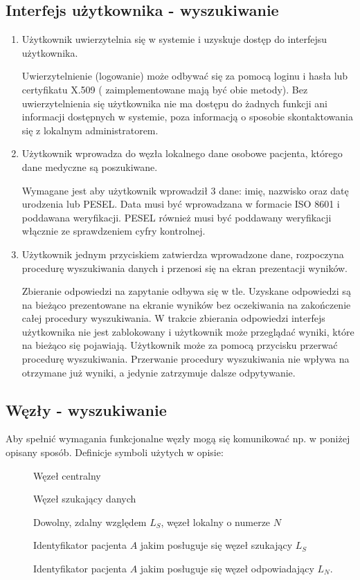 \documentclass[a4paper]{report}
\begin{document}
\subsection{Interfejs użytkownika - wyszukiwanie}
\begin{enumerate}
  \item Użytkownik uwierzytelnia się w systemie i uzyskuje dostęp do interfejsu użytkownika.

    Uwierzytelnienie (logowanie) może odbywać się za pomocą loginu i hasła lub certyfikatu X.509 (
    zaimplementowane mają być obie metody). Bez uwierzytelnienia się użytkownika nie ma dostępu do
    żadnych funkcji ani informacji dostępnych w systemie, poza informacją o sposobie skontaktowania
    się z lokalnym administratorem.

  \item Użytkownik wprowadza do węzła lokalnego dane osobowe pacjenta, którego dane medyczne są poszukiwane.

        Wymagane jest aby użytkownik wprowadził 3 dane: imię, nazwisko oraz datę urodzenia lub PESEL.
        Data musi być wprowadzana w formacie ISO 8601 i poddawana weryfikacji. PESEL również musi być
        poddawany weryfikacji włącznie ze sprawdzeniem cyfry kontrolnej.
  
  \item Użytkownik jednym przyciskiem zatwierdza wprowadzone dane, rozpoczyna procedurę wyszukiwania danych i przenosi
  się na ekran prezentacji wyników.

        Zbieranie odpowiedzi na zapytanie odbywa się w tle. Uzyskane odpowiedzi są na bieżąco prezentowane na
        ekranie wyników bez oczekiwania na zakończenie całej procedury wyszukiwania. W trakcie zbierania odpowiedzi
        interfejs użytkownika nie jest zablokowany i użytkownik może przeglądać wyniki, które na bieżąco się pojawiają.
        Użytkownik może za pomocą przycisku przerwać procedurę wyszukiwania. Przerwanie procedury wyszukiwania
        nie wpływa na otrzymane już wyniki, a jedynie zatrzymuje dalsze odpytywanie.
  
\end{enumerate}

\subsection{Węzły - wyszukiwanie}

Aby spełnić wymagania funkcjonalne węzły mogą się komunikować np. w poniżej opisany sposób.
Definicje symboli użytych w opisie:
\begin{description}
  \item[] Węzeł centralny
  \item[] Węzeł szukający danych
  \item[] Dowolny, zdalny względem $L_S$, węzeł lokalny o numerze $N$
  \item[] Identyfikator pacjenta $A$ jakim posługuje się węzeł szukający $L_S$
  \item[] Identyfikator pacjenta $A$ jakim posługuje się węzeł odpowiadający $L_N$.
\end{description}
\end{document}
